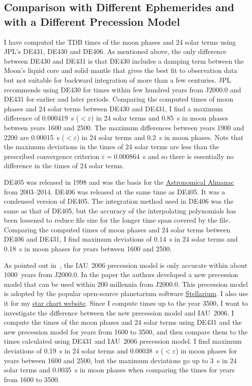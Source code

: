 \documentclass[12pt]{article}
\begin{document}
\begin{CJK}{UTF8}{bkai}
\subsection{Comparison with Different Ephemerides and with a Different 
Precession Model} 

I have computed the TDB times of the moon phases and 24 solar terms 
using JPL's DE431, DE430 and DE406. As mentioned above, the only difference 
between DE430 and DE431 is that DE430 includes a damping term between the Moon's 
liquid core and solid mantle that gives the best fit to observation data but
not suitable for backward integration of more than a few centuries. JPL recommends 
using DE430 for times within few hundred years from J2000.0 and DE431 for 
earlier and later periods. 
Comparing the computed times of moon phases and 24 solar terms between DE430 and 
DE431, I find a maximum difference of 0.000419~s ($<\varepsilon$) in 
24 solar terms and 0.85~s 
in moon phases between years 1600 and 2500. The maximum differences between 
years 1900 and 2200 are 0.00015~s ($<\varepsilon$) in 24 solar terms and 0.2~s in moon phases. 
Note that the maximum deviations in the times of 24 solar terms are less than the prescribed 
convergence criterion $\varepsilon=0.000864$~s and so there is essentially no difference 
in the times of 24 solar terms.

DE405 was released in 1998 and was the basis for the 
\href{https://en.wikipedia.org/wiki/Astronomical_Almanac}{Astronomical Almanac} from 
2003--2014. DE406 was released at the same time as DE405. It was a condensed version 
of DE405. The integration method used in DE406 was the same as that of DE405, but 
the accuracy of the interpolating polynomials has been lessened to 
reduce file size for the longer time span covered by the file. Comparing 
the computed times of moon phases and 24 solar terms between DE406 and DE431, 
I find maximum deviations of 0.14~s in 24 solar terms and 0.18~s in moon 
phases for years between 1600 and 2500.

As pointed out in~\cite{VCW}, the IAU~2006 precession model is only 
accurate within about 1000~years from J2000.0. In the paper the authors developed
a new precession model that can be used within 200 millennia from J2000.0.  
This precession model is adopted by the popular open-source planetarium 
software \href{https://stellarium.org/}{Stellarium}. I also 
use it for my \href{https://ytliu0.github.io/starCharts/}{star chart website}. 
Since I compute times up to the year 3500, I want to investigate the 
difference between the new precession model and IAU~2006. I compute 
the times of the moon phases and 24 solar terms using DE431 and the 
new precession model for years from 1600 to 3500, and then compare them to the 
times calculated using DE431 and IAU~2006 precession model. 
I find maximum deviations of 0.19~s in 24 solar 
terms and 0.00038~s ($<\varepsilon$) in moon phases for years between 1600 and 2500, but 
the maximum deviations go up to 3~s in 24 solar terms and 0.0035~s in 
moon phases when comparing the times for years from 1600 to 3500.


\end{CJK}
\end{document}
